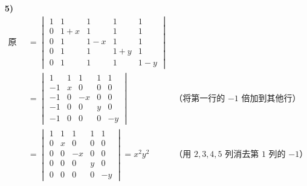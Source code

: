 \begin{problem}
\begin{solution}
\begin{enumerate}
			\item[\textbf{5)}]
			$$
			\begin{aligned}
				\text{原式} & = \begin{vmatrix}
					1 & 1 & 1 & 1 & 1 \\
					0 & 1 + x & 1 & 1 & 1 \\
					0 & 1 & 1 - x & 1 & 1 \\
					0 & 1 & 1 & 1 + y & 1 \\
					0 & 1 & 1 & 1 & 1 - y
				\end{vmatrix} \\
				& = \begin{vmatrix}
					1 & 1 & 1 & 1 & 1 \\
					-1 & x & 0 & 0 & 0 \\
					-1 & 0 & -x & 0 & 0 \\
					-1 & 0 & 0 & y & 0 \\
					-1 & 0 & 0 & 0 & -y	
				\end{vmatrix} & \text{（将第一行的 $-1$ 倍加到其他行）} \\
				& = \begin{vmatrix}
					1 & 1 & 1 & 1 & 1 \\
					0 & x & 0 & 0 & 0 \\
					0 & 0 & -x & 0 & 0 \\
					0 & 0 & 0 & y & 0 \\
					0 & 0 & 0 & 0 & -y	
				\end{vmatrix} = x^2 y^2 & \text{（用 $2,3,4,5$ 列消去第 $1$ 列的 $-1$）}\\
			\end{aligned}
			$$
		\end{enumerate}
	\end{solution}
\end{problem}


